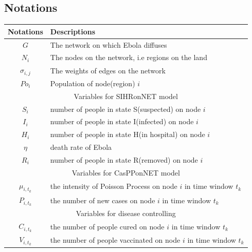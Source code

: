 \documentclass[11pt]{article}
\begin{document}
\subsection{Notations}


\begin{table}[hbtp]
\begin{center}
\begin{tabular}{|c|p{9cm} |}
\hline

Notations & Descriptions \\
\hline

$G$ & The network on which Ebola diffuses\\
\hline
$N_i$ & The nodes on the network, i.e regions on the land\\
\hline
$\sigma_{i,j}$ & The weights of edges on the network \\
\hline
$Po_{i}$ & Population of node(region) $i$ \\
\hline
  \multicolumn{2}{|c|}{Variables for SIHRonNET model} \\
\hline
$S_{i}$ & number of people in state S(suspected) on node $i$ \\

\hline
$I_{i}$ & number of people in state I(infected) on node $i$ \\
\hline

\hline
$H_{i}$ & number of people in state H(in hospital) on node $i$ \\

\hline
$\eta$ &  death rate of Ebola \\


\hline
$R_{i}$ & number of people in state R(removed) on node $i$ \\


\hline
  \multicolumn{2}{|c|}{Variables for CasPPonNET model} \\
\hline
$\mu_{i,t_k}$ & the intensity of Poisson Process on node $i$ in time window $t_k$ \\

\hline
$P_{i,t_k}$ & the number of new cases on node $i$ in time window $t_k$ \\


\hline
  \multicolumn{2}{|c|}{Variables for disease controlling} \\
\hline


$C_{i,t_k}$ & the number of people cured on node $i$ in time window $t_k$ \\

\hline
$V_{i,t_k}$ & the number of people vaccinated on node $i$ in time window $t_k$ \\


\end{tabular}
\end{center}
\end{table}
\end{document}

